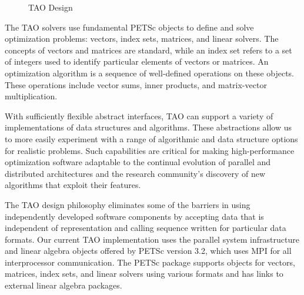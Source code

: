 
\begin{figure}
\centerline{\epsfysize=3.5in }
\caption{TAO Design}
\label{tao:design}
\end{figure}


The TAO solvers use fundamental PETSc objects to define and solve
optimization problems: vectors, index sets, matrices, and linear
solvers.  The concepts of vectors and matrices are standard, while an
index set refers to a set of integers used to identify particular
elements of vectors or matrices.  An optimization algorithm is a
sequence of well-defined operations on these objects.  These
operations include vector sums, inner products, and matrix-vector
multiplication.

With sufficiently flexible abstract interfaces, TAO can support a
variety of implementations of data structures and algorithms.  These
abstractions allow us to more easily experiment with a range of
algorithmic and data structure options for realistic problems.  
Such capabilities are critical for making
high-performance optimization software adaptable to the continual
evolution of parallel and distributed architectures and the research
community's discovery of new algorithms that exploit their features.

The TAO design philosophy eliminates some of the barriers in using
independently developed software components by accepting data that is
independent of representation and calling sequence written for
particular data formats.  Our current TAO implementation uses 
the parallel system infrastructure and linear algebra objects 
offered by PETSc version 3.2, which uses MPI \cite{using-mpi} 
for all interprocessor communication.  The PETSc package supports 
objects for vectors, matrices, index sets, and linear solvers
using various formats and has links to external linear algebra
packages.

